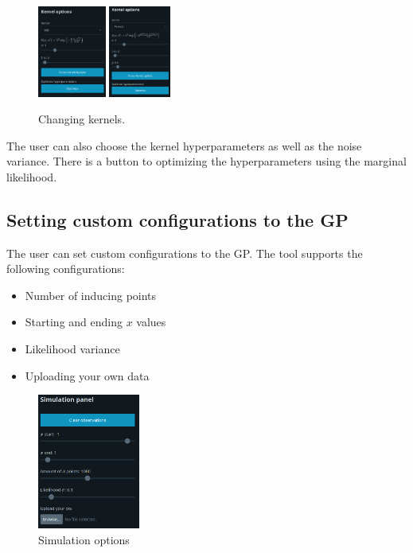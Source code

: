 \documentclass[preprint,journal]{vgtc}       %
\begin{document}
\begin{figure}[H]
  \centering
  \includegraphics[width=0.20\textwidth]{../imgs/kernel-1.png}
  \includegraphics[width=0.18\textwidth]{../imgs/kernel-2.png}
  \caption{Changing kernels.}
\end{figure}

The user can also choose the kernel hyperparameters as well as the noise variance. There is a button to optimizing the hyperparameters using the marginal likelihood.

\subsection{Setting custom configurations to the GP}

The user can set custom configurations to the GP. The tool supports the following configurations:

\begin{multicols}{2}
  \begin{itemize}
    \item Number of inducing points
    \item Starting and ending $x$ values
    \item Likelihood variance
    \item Uploading your own data
  \end{itemize}
\end{multicols}

\begin{figure}[H]
  \centering
  \includegraphics[width=0.30\textwidth]{../imgs/simulation.png}
  \caption{Simulation options}
\end{figure}
\end{document}
